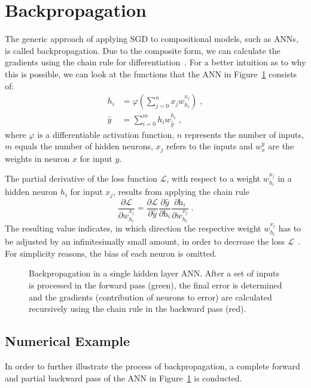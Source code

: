 \section{Backpropagation}
\label{sec:backprop}
The generic approach of applying \ac{SGD} to compositional models, such as \acp{ANN}, is called backpropagation. Due to the composite form, we can calculate the gradients using the chain rule for differentiation~\parencite[p.~395]{Hastie:2009}.  For a better intuition as to why this is possible, we can look at the functions that the \ac{ANN} in Figure~\ref{fig:backprop} consists of: 
\begin{align}	
h_i&=\varphi\left(\sum\limits_{j=0}^{n} x_j  w_{h_i}^{x_j}\right)\;, \\
\hat{y}&=\sum\limits_{i=0}^{m}h_i w_{\hat{y}}^{h_i}\;, 
\end{align}
where $\varphi$ is a differentiable activation function, $n$ represents the number of inputs, $m$ equals the number of hidden neurons, $x_j$ refers to the inputs and $w_x^y$ are the weights in neuron $x$ for input $y$.

The partial derivative of the loss function $\mathcal{L}$, with respect to a weight $w_{h_i}^{x_j}$ in a hidden neuron $h_i$ for input $x_j$, results from applying the chain rule
\begin{equation}
\frac{\partial \mathcal{L}}{\partial w_{h_i}^{x_j}} = \frac{\partial \mathcal{L}}{\partial \hat{y}} \frac{\partial \hat{y}}{\partial \mbox{h}_{i}} \frac{\partial \mbox{h}_{i}}{\partial w_{h_i}^{x_j}}\;.
\end{equation}
The resulting value indicates, in which direction the respective weight $w_{h_i}^{x_j}$ has to be adjusted by an infinitesimally small amount, in order to decrease the loss $\mathcal{L}$~\parencite[p.~169]{Rojas:2013}. For simplicity reasons, the bias of each neuron is omitted.

\begin{figure}
	\centering
	
	\caption{Backpropagation in a single hidden layer \ac{ANN}. After a set of inputs is processed in the forward pass (green), the final error is determined and the gradients (contribution of neurons to error) are calculated recursively using the chain rule in the backward pass (red).}
	\label{fig:backprop}
\end{figure}


\subsection{Numerical Example} 
In order to further illustrate the process of backpropagation, a complete forward and partial backward pass of the \ac{ANN} in Figure~\ref{fig:backprop} is conducted.

